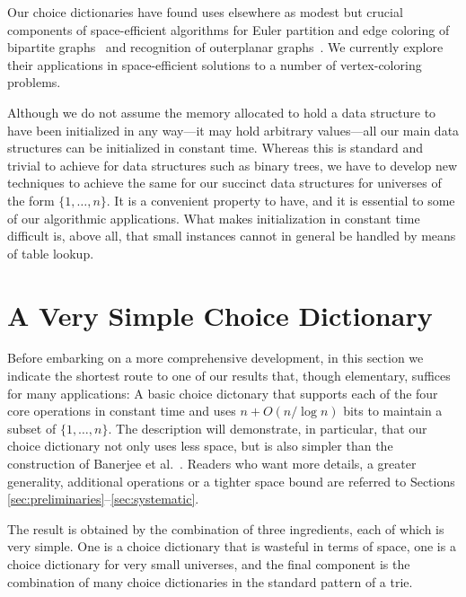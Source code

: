 \documentclass[envcountsame,envcountsect,undated,nolinenumbers]{lnthi}
\begin{document}
Our choice dictionaries have found uses elsewhere as
modest but crucial components of space-efficient
algorithms for Euler partition and
edge coloring of bipartite graphs~\cite{HagKL17}
and recognition of
outerplanar graphs~\cite{KamKL16}.
We currently explore their applications in
space-efficient solutions to a number of
vertex-coloring problems.

Although we do not assume the memory allocated
to hold a data structure to have been initialized in
any way---it may hold arbitrary values---all
our main data structures can be initialized in constant time.
Whereas this is standard and trivial to achieve for
data structures such as binary trees, we have to
develop new techniques to achieve the same
for our succinct data structures for universes
of the form $\{1,\ldots,n\}$.
It is a convenient property to have, and it
is essential to some of our algorithmic applications.
What makes initialization in constant time difficult is,
above all, that small instances cannot in general
be handled by means of table lookup.

\section{A Very Simple Choice Dictionary}
\label{sec:quick}Before embarking on a more
comprehensive
development, in this section
we indicate the shortest route to one of
our results that, though elementary,
suffices for many applications:
A basic choice dictonary that supports each
of the four core operations in constant time
and uses $n+O({n/{\log n}})$ bits to
maintain a subset of $\{1,\ldots,n\}$.
The description will demonstrate, in particular,
that our choice dictionary not only uses less
space, but is also simpler than the construction
of Banerjee et al.~\cite{BanCR16}.
Readers who want more details, a greater generality,
additional operations or a tighter space bound
are referred to Sections
\ref{sec:preliminaries}--\ref{sec:systematic}.

The result is
obtained by the combination of three ingredients,
each of which is very simple.
One is a choice dictionary that is wasteful in terms
of space, one is a choice
dictionary for very small universes, and the final component is 
the combination of many choice dictionaries
in the standard pattern of a trie.
\end{document}
